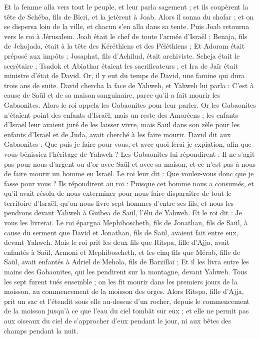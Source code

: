 \begin{multicols}{2}
Et la femme alla vers tout le peuple, et leur parla sagement ; et ils coupèrent la tête de Schéba, fils de Bicri, et la jetèrent à Joab. Alors il sonna du shofar ; et on se dispersa loin de la ville, et chacun s'en alla dans sa tente. Puis Joab retourna vers le roi à Jérusalem.
Joab était le chef de toute l'armée d'Israël ; Benaja, fils de Jehojada, était à la tête des Kéréthiens et des Péléthiens ;
Et Adoram était préposé aux impôts ; Josaphat, fils d'Achilud, était archiviste.
Scheja était le secrétaire ; Tsadok et Abiathar étaient les sacrificateurs ;
et Ira de Jaïr était ministre d’état de David.
\VerseOne{}Or, il y eut du temps de David, une famine qui dura trois ans de suite. David chercha la face de Yahweh, et Yahweh lui parla : C'est à cause de Saül et de sa maison sanguinaire, parce qu'il a fait mourir les Gabaonites.
Alors le roi appela les Gabaonites pour leur parler. Or les Gabaonites n'étaient point des enfants d'Israël, mais un reste des Amoréens ; les enfants d'Israël leur avaient juré de les laisser vivre, mais Saül dans son zèle pour les enfants d'Israël et de Juda, avait cherché à les faire mourir.
David dit aux Gabaonites : Que puis-je faire pour vous, et avec quoi ferai-je expiation, afin que vous bénissiez l'héritage de Yahweh ?
Les Gabaonites lui répondirent : Il ne s'agit pas pour nous d'argent ou d'or avec Saül et avec sa maison, et ce n'est pas à nous de faire mourir un homme en Israël. Le roi leur dit : Que voulez-vous donc que je fasse pour vous ?
Ils répondirent au roi : Puisque cet homme nous a consumés, et qu’il avait résolu de nous exterminer pour nous faire disparaître de tout le territoire d'Israël,
qu'on nous livre sept hommes d'entre ses fils, et nous les pendrons devant Yahweh à Guibea de Saül, l'élu de Yahweh. Et le roi dit : Je vous les livrerai.
Le roi épargna Mephiboscheth, fils de Jonathan, fils de Saül, à cause du serment que David et Jonathan, fils de Saül, avaient fait entre eux, devant Yahweh.
Mais le roi prit les deux fils que Ritspa, fille d'Ajja, avait enfantés à Saül, Armoni et Mephiboscheth, et les cinq fils que Mérab, fille de Saül, avait enfantés à Adriel de Mehola, fils de Barzillaï ;
Et il les livra entre les mains des Gabaonites, qui les pendirent sur la montagne, devant Yahweh. Tous les sept furent tués ensemble ; on les fit mourir dans les premiers jours de la moisson, au commencement de la moisson des orges.
Alors Ritspa, fille d'Ajja, prit un sac et l’étendit sous elle au-dessus d'un rocher, depuis le commencement de la moisson jusqu'à ce que l'eau du ciel tombât sur eux ; et elle ne permit pas aux oiseaux du ciel de s’approcher d’eux pendant le jour, ni aux bêtes des champs pendant la nuit.

\end{multicols}
